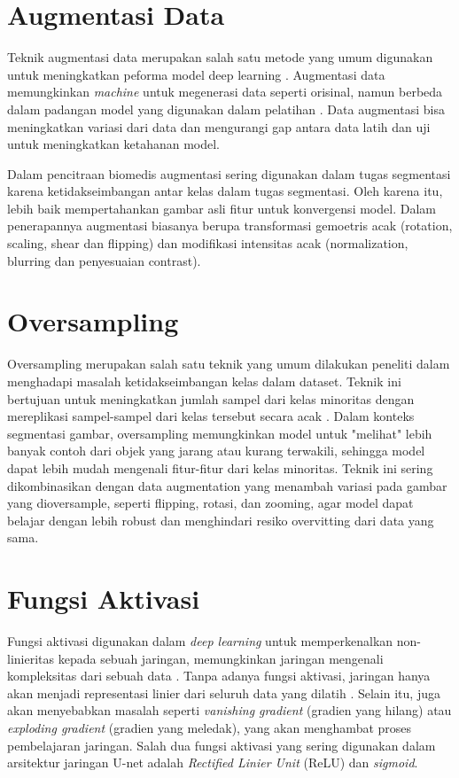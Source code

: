 \section{Augmentasi Data}

\noindent Teknik augmentasi data merupakan salah satu metode yang umum digunakan untuk meningkatkan peforma model deep learning \cite{minaee_image_2020}. Augmentasi data memungkinkan \textit{machine} untuk megenerasi data seperti orisinal, namun berbeda dalam padangan model yang digunakan dalam pelatihan \cite{huang_fully_2022}. Data augmentasi bisa meningkatkan variasi dari data dan mengurangi gap antara data latih dan uji untuk meningkatkan ketahanan model.

\noindent Dalam pencitraan biomedis augmentasi sering digunakan dalam tugas segmentasi karena ketidakseimbangan antar kelas dalam tugas segmentasi. Oleh karena itu, lebih baik mempertahankan gambar asli fitur untuk konvergensi model. Dalam penerapannya augmentasi biasanya berupa transformasi gemoetris acak (rotation, scaling, shear dan flipping) dan modifikasi intensitas acak (normalization, blurring dan penyesuaian contrast)\cite{minaee_image_2020}.

\section{Oversampling}

\noindent Oversampling merupakan salah satu teknik yang umum dilakukan peneliti dalam menghadapi masalah ketidakseimbangan kelas dalam dataset. Teknik ini bertujuan untuk meningkatkan jumlah sampel dari kelas minoritas dengan mereplikasi sampel-sampel dari kelas tersebut secara acak \cite{bria_addressing_2020}. Dalam konteks segmentasi gambar, oversampling memungkinkan model untuk "melihat" lebih banyak contoh dari objek yang jarang atau kurang terwakili, sehingga model dapat lebih mudah mengenali fitur-fitur dari kelas minoritas. Teknik ini sering dikombinasikan dengan data augmentation yang menambah variasi pada gambar yang dioversample, seperti flipping, rotasi, dan zooming, agar model dapat belajar dengan lebih robust dan menghindari resiko overvitting dari data yang sama.


\section{Fungsi Aktivasi}

\noindent Fungsi aktivasi digunakan dalam \textit{deep learning} untuk memperkenalkan non-linieritas kepada sebuah jaringan, memungkinkan jaringan mengenali kompleksitas dari sebuah data \cite{younisse_fine-tuning_2023,heaton_ian_2018}. Tanpa adanya fungsi aktivasi, jaringan hanya akan menjadi representasi linier dari seluruh data yang dilatih \cite{chiang_activation_2023}. Selain itu, juga akan menyebabkan masalah seperti \textit{vanishing gradient} (gradien yang hilang) atau \textit{exploding gradient} (gradien yang meledak), yang akan menghambat proses pembelajaran jaringan. Salah dua fungsi aktivasi yang sering digunakan dalam arsitektur jaringan U-net adalah \textit{Rectified Linier Unit} (ReLU) dan \textit{sigmoid}. %

